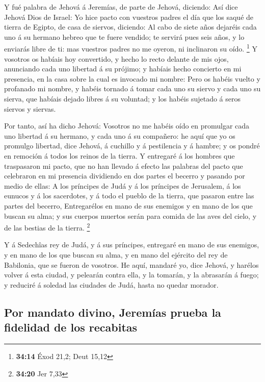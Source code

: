  Y fué palabra de Jehová á Jeremías, de parte de Jehová,
diciendo:  Así dice Jehová Dios de Israel: Yo hice pacto
con vuestros padres el día que los saqué de tierra de Egipto, de casa de
siervos, diciendo:  Al cabo de siete años dejaréis cada
uno á su hermano hebreo que te fuere vendido; te servirá pues seis años,
y lo enviarás libre de ti: mas vuestros padres no me oyeron, ni
inclinaron su oído. \footnote{\textbf{34:14} Éxod 21,2; Deut 15,12}
 Y vosotros os habíais hoy convertido, y hecho lo recto
delante de mis ojos, anunciando cada uno libertad á su prójimo; y
habíais hecho concierto en mi presencia, en la casa sobre la cual es
invocado mi nombre:  Pero os habéis vuelto y profanado mi
nombre, y habéis tornado á tomar cada uno su siervo y cada uno su
sierva, que habíais dejado libres á su voluntad; y los habéis sujetado á
seros siervos y siervas.

 Por tanto, así ha dicho Jehová: Vosotros no me habéis
oído en promulgar cada uno libertad á su hermano, y cada uno á su
compañero: he aquí que yo os promulgo libertad, dice Jehová, á cuchillo
y á pestilencia y á hambre; y os pondré en remoción á todos los reinos
de la tierra.  Y entregaré á los hombres que traspasaron
mi pacto, que no han llevado á efecto las palabras del pacto que
celebraron en mi presencia dividiendo en dos partes el becerro y pasando
por medio de ellas:  A los príncipes de Judá y á los
príncipes de Jerusalem, á los eunucos y á los sacerdotes, y á todo el
pueblo de la tierra, que pasaron entre las partes del becerro,
 Entregarélos en mano de sus enemigos y en mano de los
que buscan su alma; y sus cuerpos muertos serán para comida de las aves
del cielo, y de las bestias de la tierra. \footnote{\textbf{34:20} Jer
  7,33}

 Y á Sedechîas rey de Judá, y á sus príncipes, entregaré
en mano de sus enemigos, y en mano de los que buscan su alma, y en mano
del ejército del rey de Babilonia, que se fueron de vosotros.
 He aquí, mandaré yo, dice Jehová, y harélos volver á
esta ciudad, y pelearán contra ella, y la tomarán, y la abrasarán á
fuego; y reduciré á soledad las ciudades de Judá, hasta no quedar
morador.

\hypertarget{por-mandato-divino-jeremuxedas-prueba-la-fidelidad-de-los-recabitas}{%
\subsection{Por mandato divino, Jeremías prueba la fidelidad de los
recabitas}\label{por-mandato-divino-jeremuxedas-prueba-la-fidelidad-de-los-recabitas}}

